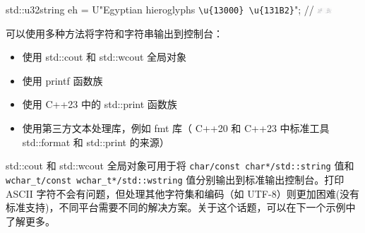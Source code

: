 \begin{tcolorbox}[ breakable,colback = blue!5!white, colframe=black!7!white]
\scriptsize{
std::u32string eh = U"Egyptian hieroglyphs \verb|\u{13000} \u{131B2}|"; // \includegraphics[width=0.04\textwidth]{content/chapter2/images/code-4.png}
}
\end{tcolorbox}

可以使用多种方法将字符和字符串输出到控制台：

\begin{itemize}
\item
使用 std::cout 和 std::wcout 全局对象

\item
使用 printf 函数族

\item
使用 C++23 中的 std::print 函数族

\item
使用第三方文本处理库，例如 fmt 库（ C++20 和 C++23 中标准工具 std::format 和 std::print 的来源）
\end{itemize}

std::cout 和 std::wcout 全局对象可用于将 \verb|char/const char*/std::string| 值和 \verb|wchar_t/const wchar_t*/std::wstring| 值分别输出到标准输出控制台。打印 ASCII 字符不会有问题，但处理其他字符集和编码（如 UTF-8）则更加困难(没有标准支持)，不同平台需要不同的解决方案。关于这个话题，可以在下一个示例中了解更多。








